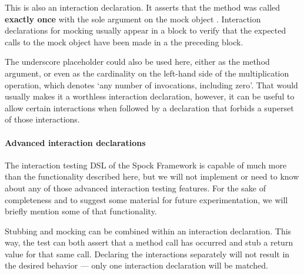 This is also an interaction declaration. It asserts that
the method  was called \textbf{exactly once} with
the sole argument  on
the mock object .
Interaction declarations for mocking usually appear in a  block
to verify that the expected calls to the mock object
have been made in a the preceding  block.

The underscore placeholder could also be used here,
either as the method argument,
or even as the cardinality
on the left-hand side of the multiplication operation,
which denotes `any number of invocations, including zero'.
That would usually makes it a worthless interaction declaration,
however, it can be useful to allow certain interactions when followed by
a declaration that forbids a superset of those interactions.
\autocite[Chapter: Interaction Based Testing - Mocking - Strict Mocking]{SpockFrameworkDoc}

\paragraph{Advanced interaction declarations}
The interaction testing DSL of the Spock Framework
is capable of much more than the functionality described here,
but we will not implement or need to know about any of
those advanced interaction testing features.
For the sake of completeness
and to suggest some material for future experimentation,
we will briefly mention some of that functionality.

Stubbing and mocking can be combined
within an interaction declaration.
This way, the test can both assert that
a method call has occurred and
stub a return value for that same call.
Declaring the interactions separately
will not result in the desired behavior ---
only one interaction declaration will be matched.
\autocite[Chapter: Interaction Based Testing - Combining Mocking and Stubbing]{SpockFrameworkDoc}

